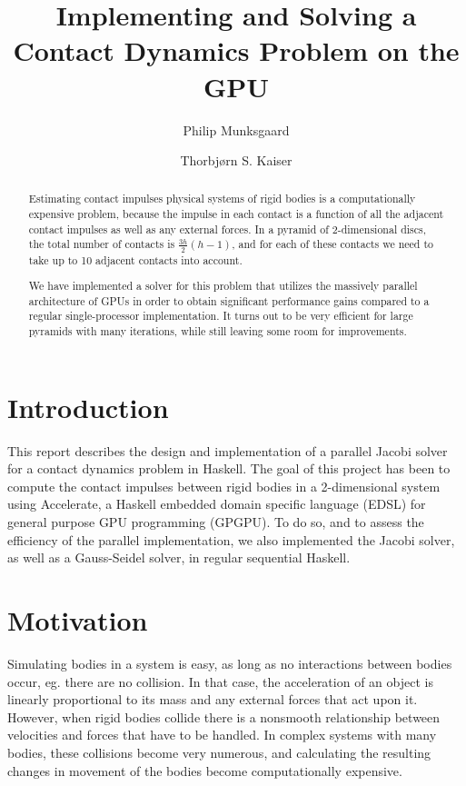 \documentclass[runningheads,a4paper]{llncs}
\title{Implementing and Solving a Contact Dynamics Problem on the GPU}
\author{Philip Munksgaard \and Thorbjørn S. Kaiser}
\institute{
    University of Copenhagen Department of Computer Science (DIKU), \\
    Nørre Campus, Universitetsparken 5, DK-2100 Copenhagen Ø, Denmark
}
\begin{document}
\mainmatter
\maketitle

\begin{abstract}
Estimating contact impulses physical systems of rigid bodies is a
computationally expensive problem, because the impulse in each contact is a
function of all the adjacent contact impulses as well as any external
forces. In a pyramid of 2-dimensional discs, the total number of contacts is
$\frac{3h}{2} (h-1)$, and for each of these contacts we need to take up to 10
adjacent contacts into account.

We have implemented a solver for this problem that utilizes the massively
parallel architecture of GPUs in order to obtain significant performance gains
compared to a regular single-processor implementation. It turns out to be very
efficient for large pyramids with many iterations, while still leaving some
room for improvements.

\end{abstract}

\section{Introduction}

This report describes the design and implementation of a parallel Jacobi solver
for a contact dynamics problem in Haskell. The goal of this project has been to
compute the contact impulses between rigid bodies in a 2-dimensional system
using Accelerate, a Haskell embedded domain specific language (EDSL) for general
purpose GPU programming (GPGPU). To do so, and to assess the efficiency of the
parallel implementation, we also implemented the Jacobi solver, as well as a
Gauss-Seidel solver, in regular sequential Haskell.


\section{Motivation}

Simulating bodies in a system is easy, as long as no interactions between
bodies occur, eg. there are no collision. In that case, the acceleration of an
object is linearly proportional to its mass and any external forces that act
upon it. However, when rigid bodies collide there is a nonsmooth relationship
between velocities and forces that have to be handled. In complex systems with
many bodies, these collisions become very numerous, and calculating the
resulting changes in movement of the bodies become computationally expensive.
\end{document}
